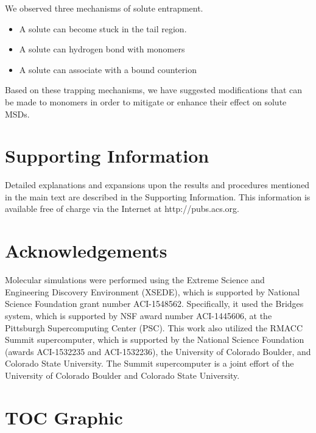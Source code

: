 \documentclass{article}
\begin{document}
  
  We observed three mechanisms of solute entrapment.
  \begin{itemize}
    \item A solute can become stuck in the tail region. 
    \item A solute can hydrogen bond with monomers
    \item A solute can associate with a bound counterion
  \end{itemize}
  
  Based on these trapping mechanisms, we have suggested modifications that
  can be made to monomers in order to mitigate or enhance their effect on
  solute MSDs.
 
  \section*{Supporting Information}

  Detailed explanations and expansions upon the results and procedures mentioned in
  the main text are described in the Supporting Information. This information is
  available free of charge via the Internet at http://pubs.acs.org.

  \section*{Acknowledgements}

  Molecular simulations were performed using the Extreme Science and
  Engineering Discovery Environment (XSEDE), which is supported by National
  Science Foundation grant number ACI-1548562. Specifically, it used the Bridges
  system, which is supported by NSF award number ACI-1445606, at the Pittsburgh
  Supercomputing Center (PSC). This work also utilized the RMACC Summit supercomputer,
  which is supported by the National Science Foundation (awards ACI-1532235 and
  ACI-1532236), the University of Colorado Boulder, and Colorado State
  University. The Summit supercomputer is a joint effort of the University of
  Colorado Boulder and Colorado State University.

  \clearpage

  
  

  \newpage

  \section*{TOC Graphic}
\end{document}
